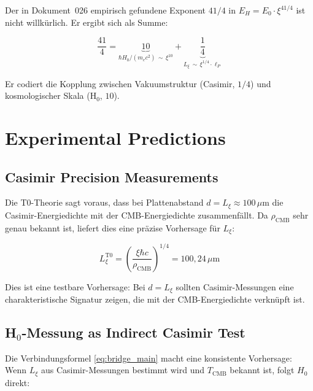 \begin{keyresult}
    Der in Dokument~026 empirisch gefundene Exponent $41/4$ in
    $E_H = E_0 \cdot \xi^{41/4}$ ist nicht willkürlich. Er ergibt sich
    als Summe:

    \begin{equation}
        \frac{41}{4}
        = \underbrace{10}_{\hbar H_0/(m_e c^2) \,\sim\, \xi^{10}}
        + \underbrace{\frac{1}{4}}_{L_\xi \,\sim\, \xi^{1/4} \cdot \ell_P}
        \label{eq:41_4_explained}
    \end{equation}

    Er codiert die Kopplung zwischen Vakuumstruktur (Casimir, $1/4$)
    und kosmologischer Skala (H$_0$, $10$).
\end{keyresult}

\section{Experimental Predictions}
\label{sec:predictions}

\subsection{Casimir Precision Measurements}

Die T0-Theorie sagt voraus, dass bei Plattenabstand $d = L_\xi \approx 100\,\mu\text{m}$
die Casimir-Energiedichte mit der CMB-Energiedichte zusammenfällt. Da $\rho_\text{CMB}$
sehr genau bekannt ist, liefert dies eine präzise Vorhersage für $L_\xi$:

\begin{equation}
    L_\xi^\text{T0}
    = \left(\frac{\xi\hbar c}{\rho_\text{CMB}}\right)^{1/4}
    = 100{,}24\,\mu\text{m}
    \label{eq:Lxi_prediction}
\end{equation}

Dies ist eine testbare Vorhersage: Bei $d = L_\xi$ sollten Casimir-Messungen
eine charakteristische Signatur zeigen, die mit der CMB-Energiedichte
verknüpft ist.

\subsection{H\texorpdfstring{$_0$}{0}-Messung as Indirect Casimir Test}

Die Verbindungsformel \eqref{eq:bridge_main} macht eine konsistente Vorhersage:
Wenn $L_\xi$ aus Casimir-Messungen bestimmt wird und $T_\text{CMB}$ bekannt ist,
folgt $H_0$ direkt:

